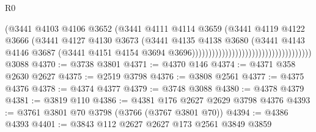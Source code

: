 \begin{lexlean}{R0}
\begin{coremodule}
                                                              (@3441
                                                                @4103
                                                                @4106
                                                                @3652
                                                                (@3441
                                                                  @4111
                                                                  @4114
                                                                  @3659
                                                                  (@3441
                                                                    @4119
                                                                    @4122
                                                                    @3666
                                                                    (@3441
                                                                      @4127
                                                                      @4130
                                                                      @3673
                                                                      (@3441
                                                                        @4135
                                                                        @4138
                                                                        @3680
                                                                        (@3441
                                                                          @4143
                                                                          @4146
                                                                          @3687
                                                                          (@3441
                                                                            @4151
                                                                            @4154
                                                                            @3694
                                                                            @3696))))))))))))))))))))))))))))))))))))
    @3088
@4370 := @3738 @3801
@4371 := @4370 @146
@4374 := @4371 @358 @2630 @2627
@4375 := @2519 @3798
@4376 := @3808 @2561
@4377 := @4375 @4376
@4378 := @4374 @4377
@4379 := @3748 @3088
@4380 := @4378 @4379
@4381 := @3819 @110
@4386 := @4381 @176 @2627 @2629 @3798 @4376
@4393 := @3761 @3801 @70 @3798 (@3766 (@3767 @3801 @70))
@4394 := @4386 @4393
@4401 := @3843 @112 @2627 @2627 @173 @2561 @3849 @3859

\end{coremodule}
\end{lexlean}
